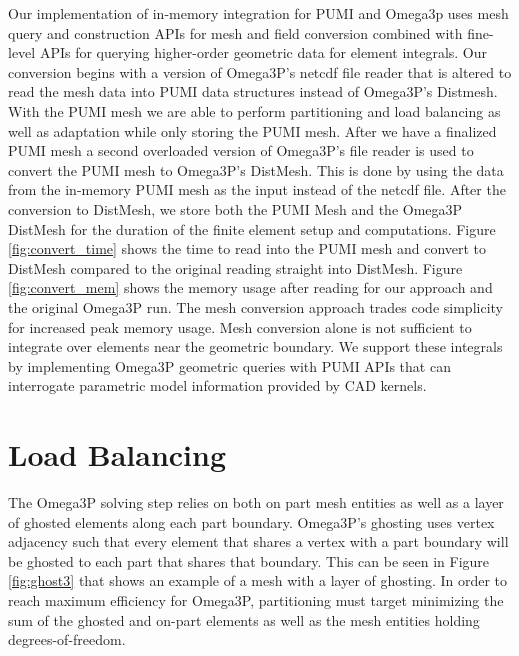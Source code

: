 \documentclass[a4paper]{article}
\begin{document}
Our implementation of in-memory integration for PUMI and Omega3p uses
mesh query and construction APIs for mesh and field conversion combined with
fine-level APIs for querying higher-order geometric data for element
integrals. 
Our conversion begins with a version of Omega3P's netcdf file reader that is altered 
to read the mesh data into PUMI data structures instead of Omega3P's Distmesh. With 
the PUMI mesh we are able to perform partitioning and load balancing as well as adaptation 
while only storing the PUMI mesh. After we have a finalized PUMI mesh a second 
overloaded version of Omega3P's file reader is used to convert the PUMI mesh to 
Omega3P's DistMesh. This is done by using the data from the in-memory PUMI mesh as the 
input instead of the netcdf file. After the conversion to DistMesh, we store both the 
PUMI Mesh and the Omega3P DistMesh for the duration of the finite element setup and 
computations. Figure \ref{fig:convert_time} shows the time to read into the PUMI mesh 
and convert to DistMesh compared to the original reading straight into DistMesh.
Figure \ref{fig:convert_mem} shows the memory usage after reading for our approach and 
the original Omega3P run. 
The mesh conversion approach trades code simplicity for increased peak memory usage.
Mesh conversion alone is not sufficient to integrate over elements near the
geometric boundary.
We support these integrals by implementing Omega3P geometric queries with PUMI
APIs that can interrogate parametric model information provided by CAD
kernels.

\section{Load Balancing}\label{sec:lb}

The Omega3P solving step relies on both on part mesh entities as well as a layer of 
ghosted elements along each part boundary. Omega3P's ghosting uses vertex adjacency such
that every element that shares a vertex with a part boundary will be ghosted to each part that shares that boundary. This can be seen in Figure \ref{fig:ghost3} that shows an 
example of a mesh with a layer of ghosting. In order to reach maximum efficiency
for Omega3P, partitioning must target minimizing the sum of the 
ghosted and on-part elements as well as the mesh entities holding degrees-of-freedom.
\end{document}
